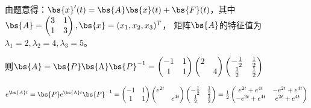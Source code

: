 \documentclass[12pt, a4paper, oneside, UTF8]{ctexbook}
\begin{document}
\begin{solution}
    由题意得：$\bs{x}'(t)=\bs{A}\bs{x}(t)+\bs{F}(t)$，其中$\bs{A}=\begin{pmatrix}
        3 & 1\\
        1 &3 \\
    \end{pmatrix},\bs{x}=(x_1,x_2,x_3)^T$，
    矩阵$\bs{A}$的特征值为$\lambda_1=2,\lambda_2=4,\lambda_3=5$。

    则$\bs{A}=\bs{P}\bs{\Lambda}\bs{P}^{-1}=\begin{pmatrix}
        -1 & 1\\
        1 &1  \\
    \end{pmatrix} \begin{pmatrix}
        2 & \\
        & 4
    \end{pmatrix} \begin{pmatrix}
        -\frac{1}{2}& \frac{1}{2}\\
        \frac{1}{2}&\frac{1}{2}\\
    \end{pmatrix}$

    $e^{\bs{A}t}=\bs{P}e^{\bs{\Lambda}t}\bs{P}^{-1}
    =\begin{pmatrix}
        -1 & 1\\
        1 &1  \\
    \end{pmatrix} \begin{pmatrix}
        e^{2t} & \\
        & e^{4t}
    \end{pmatrix} \begin{pmatrix}
        -\frac{1}{2}& \frac{1}{2}\\
        \frac{1}{2}&\frac{1}{2}\\
    \end{pmatrix}
    =\frac{1}{2} \begin{pmatrix}
        e^{2t}+e^{4t} & -e^{2t}+e^{4t}\\
        -e^{2t}+e^{4t}& e^{2t}+e^{4t}
    \end{pmatrix}$
    

\end{solution}
\end{document}
